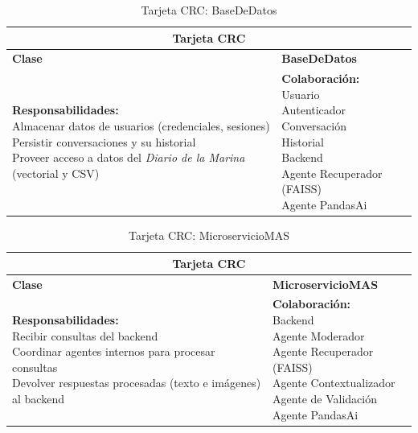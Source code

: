 \begin{addendum}
		\begin{longtable}{|l|l|}
			\caption{Tarjeta CRC: BaseDeDatos} \label{tablacrc12} \\
			\hline
			\multicolumn{2}{|c|}{\textbf{Tarjeta CRC}} \\
			\hline
			\textbf{Clase} & \textbf{BaseDeDatos} \\
			\hline
			\parbox[t]{0.45\linewidth}{\textbf{Responsabilidades:} \\ 
				Almacenar datos de usuarios (credenciales, sesiones) \\ 
				Persistir conversaciones y su historial \\ 
				Proveer acceso a datos del \textit{Diario de la Marina} (vectorial y CSV)} 
			& 
			\parbox[t]{0.45\linewidth}{\textbf{Colaboración:} \\ 
				Usuario \\ 
				Autenticador \\ 
				Conversación \\ 
				Historial \\ 
				Backend \\ 
				Agente Recuperador (FAISS) \\ 
				Agente PandasAi} \\
			\hline
		\end{longtable}
		
		\begin{longtable}{|l|l|}
			\caption{Tarjeta CRC: MicroservicioMAS} \label{tablacrc13} \\
			\hline
			\multicolumn{2}{|c|}{\textbf{Tarjeta CRC}} \\
			\hline
			\textbf{Clase} & \textbf{MicroservicioMAS} \\
			\hline
			\parbox[t]{0.45\linewidth}{\textbf{Responsabilidades:} \\ 
				Recibir consultas del backend \\ 
				Coordinar agentes internos para procesar consultas \\ 
				Devolver respuestas procesadas (texto e imágenes) al backend} 
			& 
			\parbox[t]{0.45\linewidth}{\textbf{Colaboración:} \\ 
				Backend \\ 
				Agente Moderador \\ 
				Agente Recuperador (FAISS) \\ 
				Agente Contextualizador \\ 
				Agente de Validación \\ 
				Agente PandasAi} \\
			\hline
		\end{longtable}
		
		
\end{addendum}
